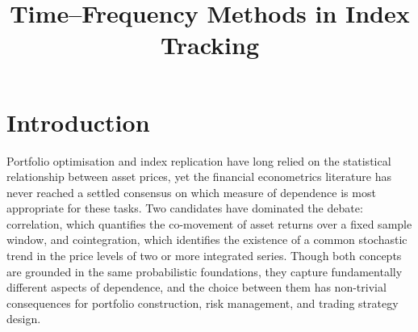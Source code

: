 \documentclass[12pt,a4paper]{article}
\title{\textbf{Time--Frequency Methods in Index Tracking}}
\begin{document}
\maketitle



\section{Introduction}
\label{sec:introduction}

Portfolio optimisation and index replication have long relied on the
statistical relationship between asset prices, yet the financial
econometrics literature has never reached a settled consensus on which
measure of dependence is most appropriate for these tasks. Two candidates
have dominated the debate: correlation, which quantifies the co-movement
of asset returns over a fixed sample window, and cointegration, which
identifies the existence of a common stochastic trend in the price levels
of two or more integrated series. Though both concepts are grounded in
the same probabilistic foundations, they capture fundamentally different
aspects of dependence, and the choice between them has non-trivial
consequences for portfolio construction, risk management, and trading
strategy design.
\end{document}
